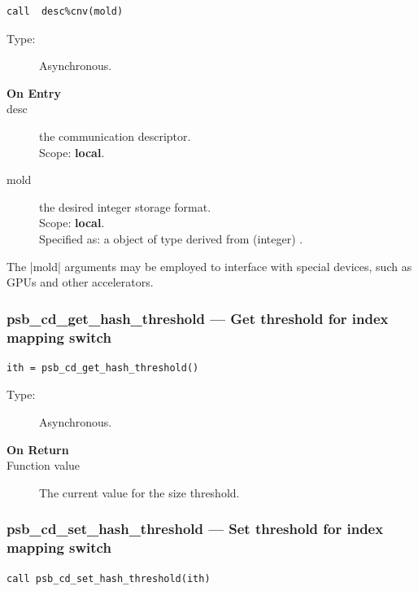 \begin{verbatim}
call  desc%cnv(mold)
\end{verbatim}

\begin{description}
\item[Type:] Asynchronous.
\item[\bf On Entry]
\item[desc] the communication descriptor.\\
Scope: {\bf local}.\\
\item[mold] the desired integer storage format.\\
Scope: {\bf local}.\\
Specified as: a object of type derived from (integer) \vbasedata.
\end{description}
The \fortinline|mold|  arguments may be
employed to interface with special devices, such as GPUs and other
accelerators. 



\subsubsection{psb\_cd\_get\_hash\_threshold --- Get threshold for
  index mapping switch}

\begin{verbatim}
ith = psb_cd_get_hash_threshold()
\end{verbatim}

\begin{description}
\item[Type:] Asynchronous.
\item[\bf On Return]
\item[Function value] The current value for the size threshold. 

\end{description}



\subsubsection{psb\_cd\_set\_hash\_threshold --- Set threshold for
  index mapping switch}

\begin{verbatim}
call psb_cd_set_hash_threshold(ith)
\end{verbatim}

